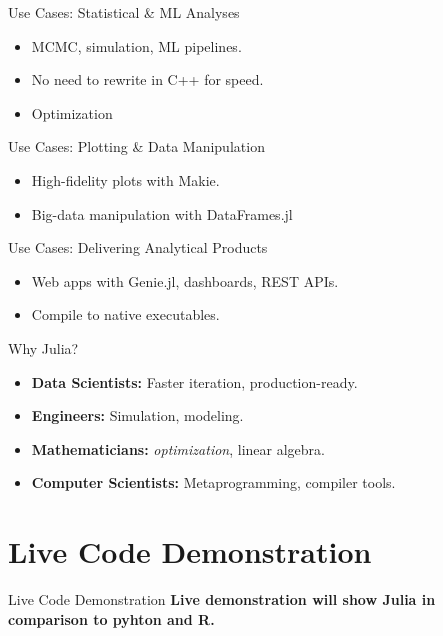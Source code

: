 \documentclass{beamer}
\begin{document}
\begin{frame}{Use Cases: Statistical \& ML Analyses}
\begin{itemize}
    \item MCMC, simulation, ML pipelines.
    \item No need to rewrite in C++ for speed.
    \item Optimization
\end{itemize}
\end{frame}

\begin{frame}{Use Cases: Plotting \& Data Manipulation}
\begin{itemize}
    \item High-fidelity plots with Makie.
    \item Big-data manipulation with DataFrames.jl
\end{itemize}
\end{frame}

\begin{frame}{Use Cases: Delivering Analytical Products}
\begin{itemize}
    \item Web apps with Genie.jl, dashboards, REST APIs.
    \item Compile to native executables.
\end{itemize}
\end{frame}

\begin{frame}{Why Julia?}
\begin{itemize}
    \item \textbf{Data Scientists:} Faster iteration, production-ready.
    \item \textbf{Engineers:} Simulation, modeling.
    \item \textbf{Mathematicians:}  \textit{optimization}, linear algebra.
    \item \textbf{Computer Scientists:} Metaprogramming, compiler tools.
\end{itemize}
\end{frame}

\section{Live Code Demonstration}

\begin{frame}{Live Code Demonstration}
\textbf{Live demonstration will show Julia in comparison to pyhton and R.}
\end{frame}
\end{document}

